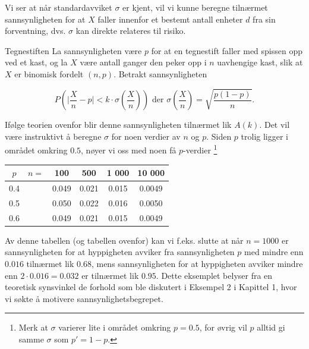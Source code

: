\begin{center}  \end{center}

\noindent Vi ser at når standardavviket $\sigma$ er kjent, vil vi kunne
beregne tilnærmet sannsynligheten for at $X$ faller innenfor et
bestemt antall enheter $d$ fra sin forventning, dvs. $\sigma$ kan
direkte relateres til risiko. \\


\begin{eksempel}{Tegnestiften}
La sannsynligheten være $p$ for at en tegnestift faller med
spissen opp ved et kast, og la $X$ være antall ganger den peker
opp i $n$ uavhengige kast, slik at $X$ er binomisk fordelt
$(n,p)$. Betrakt sannsynligheten

\[ P(\mid \frac{X}{n}-p \mid < k \cdot \sigma (\frac{X}{n})) \mbox{\ \ der \ }
                        \sigma (\frac{X}{n})=\sqrt{\frac{p(1-p)}{n}} .\]

\noindent Ifølge teorien ovenfor blir denne sannsynligheten tilnærmet
 lik $A(k)$. Det vil være instruktivt å beregne $\sigma$ for noen
verdier av $n$ og $p$. Siden $p$ trolig ligger i området omkring
$0.5$, nøyer vi oss med noen få $p$-verdier \footnote{Merk at
$\sigma $ varierer lite i området omkring $p=0.5$, for øvrig vil
$p$ alltid gi samme $\sigma$ som $p'=1-p$.}

\begin{center}
\begin{tabular}{c|ccccc}
 $p$   & $n=$& 100 & 500 &1 000&10 000 \\ \hline
 0.4   &     &0.049&0.021&0.015&0.0049 \\
 0.5   &     &0.050&0.022&0.016&0.0050 \\
 0.6   &     &0.049&0.021&0.015&0.0049 \\ \hline
\end{tabular}
\end{center}
\noindent Av denne tabellen (og tabellen ovenfor) kan vi f.eks. slutte at
når $n=1000$ er sannsynligheten for at hyppigheten avviker fra
sannsynligheten $p$ med mindre enn $0.016$ tilnærmet lik $0.68$,
mens sannsynligheten for at hyppigheten avviker mindre enn
$2\cdot 0.016=0.032$ er tilnærmet lik $0.95$. Dette eksemplet
belyser fra en teoretisk synsvinkel de forhold som ble diskutert
i Eksempel 2 i Kapittel 1, hvor vi søkte å motivere
sannsynlighetsbegrepet.
\end{eksempel}


